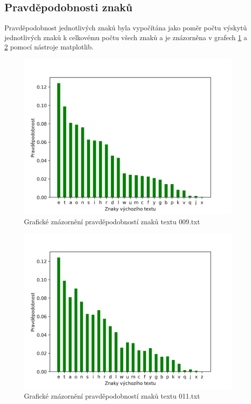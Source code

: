 \documentclass[12pt]{article}
\begin{document}
				\subsection{Pravděpodobnosti znaků}\label{pz}
			 Pravděpodobnost jednotlivých znaků byla vypočítána jako poměr počtu výskytů jednotlivých znaků k celkovému počtu všech znaků a je znázorněna v grafech \ref{009_graph2} a \ref{011_graph2} pomocí nástroje matplotlib.
						
\begin{figure}[!htb]
\includegraphics[scale=0.8]{009_char_prob.png}\centering\caption{Grafické znázornění pravděpodobností znaků textu 009.txt}\label{009_graph2}
\end{figure}

\begin{figure}[!htb]
\includegraphics[scale=0.8]{011_char_prob.png}\centering\caption{Grafické znázornění pravděpodobností znaků textu 011.txt}\label{011_graph2}
\end{figure}
\end{document}

